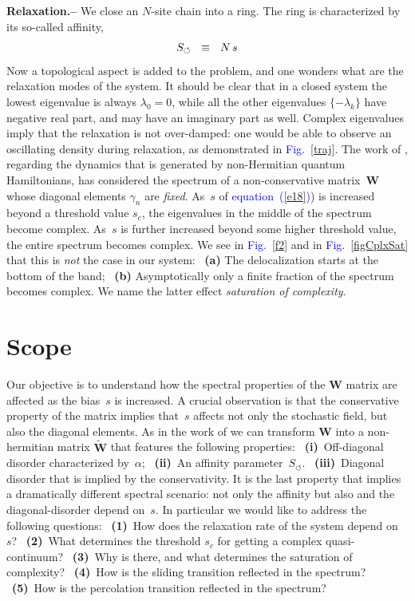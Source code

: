 \documentclass[aps,pre,floats,floatfix,twocolumn]{revtex4}
\newcommand{\be}[1]{\begin{eqnarray}\ifthenelse{#1=-1}{\nonumber}{\ifthenelse{#1=0}{}{\label{e#1}}}}
\newcommand{\eeq}{\end{eqnarray}}
\newcommand{\Eq}[1]{\textcolor{blue}{{equation}\!~(\ref{#1})}}
\newcommand{\Fig}[1]{\textcolor{blue}{Fig.}\!\!~\ref{#1}}
\newcommand{\sect}[1]{{\bf #1.-- }}
\begin{document}
\sect{Relaxation}
%
We close an $N$-site chain into a ring. 
The ring is characterized by its so-called affinity, 
%
\be{18}
S_{\circlearrowleft} \ \ \equiv \ \ N \, s
\eeq 
%
Now a topological aspect is added to the problem, 
and one wonders what are the relaxation modes of the system. 
It should be clear that in a closed system 
the lowest eigenvalue is always ${\lambda_0=0}$, 
while all the other eigenvalues ${\{-\lambda_k\}}$ have negative real part, 
and may have an imaginary part as well. 
Complex eigenvalues imply that the relaxation is not over-damped: 
one would be able to observe an oscillating density during relaxation, 
as demonstrated in \Fig{traj}.    
%
The work of \cite{Shnerb1}, regarding the dynamics that is generated by non-Hermitian quantum Hamiltonians, has considered the spectrum of a non-conservative matrix~$\bm{W}$ whose diagonal elements $\gamma_n$ are {\em fixed}. 
As~$s$ of \Eq{e18}) is increased beyond a threshold value $s_{c}$, 
the eigenvalues in the middle of the spectrum become complex. 
As~$s$ is further increased beyond some higher threshold value, 
the entire spectrum becomes complex. 
%
We see in \Fig{f2} and in \Fig{figCplxSat}
that this is {\em not} the case in our system: 
{\ \bf (a)} The delocalization starts at the bottom of the band; 
{\ \bf (b)} Asymptotically only a finite fraction of the spectrum becomes complex. 
We name the latter effect {\em saturation of complexity}.



\section{Scope}

Our objective is to understand how the spectral properties of
the $\bm{W}$ matrix are affected as the bias~$s$ is increased. 
A crucial observation is that the conservative property of 
the matrix implies that~$s$ affects not only the stochastic field, 
but also the diagonal elements. As in the work of \cite{Shnerb1} 
we can transform $\bm{W}$ into a non-hermitian matrix $\tilde{\bm{W}}$ 
that features the following properties: 
%
{\ \bf (i)}~Off-diagonal disorder characterized by~$\alpha$;  
{\ \bf (ii)}~An affinity parameter~$S_{\circlearrowleft}$. 
{\ \bf (iii)}~Diagonal disorder that is implied by the conservativity.
%
It is the last property that implies a dramatically different 
spectral scenario: not only the affinity 
but also and the diagonal-disorder depend on~$s$. 
In particular we would like to address the following questions:    
%
{\ \bf (1)}~How does the relaxation rate of the system depend on~$s$?
{\ \bf (2)}~What determines the threshold $s_c$ for getting a complex quasi-continuum?
{\ \bf (3)}~Why is there, and what determines the saturation of complexity?
{\ \bf (4)}~How is the sliding transition reflected in the spectrum?
{\ \bf (5)}~How is the percolation transition reflected in the spectrum?
\end{document}
